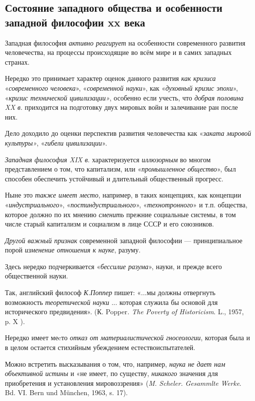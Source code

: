 \documentclass[a4paper,14pt,russian]{extreport}
\begin{document}
\subsection{Состояние западного общества и особенности западной философии xx века}

Западная философия \emph{активно реагирует} на особенности современного развития человечества, на процессы происходящие во всём мире и в самих западных странах.

Нередко это принимает характер оценок данного развития \emph{как кризиса} «\emph{современного человека}», «\emph{современной науки}», как «\emph{духовный кризис эпохи}», «\emph{кризис технической цивилизации»}, особенно если учесть, что \emph{добрая половина XX в}. приходится на подготовку двух мировых войн и залечивание ран после них.

Дело доходило до оценки перспектив развития человечества как «\emph{заката мировой культуры»}, «\emph{гибели цивилизации}».

\emph{Западная философия XIX в}. характеризуется \emph{иллюзорным} во многом представлением о том, что капитализм, или «\emph{промышленное общество}», был способен обеспечить устойчивый и длительный общественный прогресс.

Ныне это \emph{также имеет место}, например, в таких концепциях, как концепции «\emph{индустриального}», «\emph{постиндустриального}», «\emph{технотронного}» и т.п. общества, которое должно по их мнению \emph{сменить} прежние социальные системы, в том числе старый капитализм и социализм в лице СССР и его союзников.

\emph{Другой важный признак} современной западной философии --- принципиальное порой \emph{изменение отношения к науке}, разуму.

Здесь нередко подчеркивается «\emph{бессилие разума}», науки, и прежде всего общественной науки.

Так, английский философ \emph{К.Поппер} пишет: «...мы должны отвергнуть возможность \emph{теоретической науки} ... которая служила бы основой для исторического предвидения». (К. Popper\emph{. The Poverty of Historicism}. L., 1957, p. X ).

Нередко имеет меcто \emph{отказ от материалистической гносеологии}, которая была и в целом остается стихийным убеждением естествоиспытателей.

Можно встретить высказывания о том, что, например, \emph{наука не дает нам объективной истины} и «не имеет, по существу, \emph{никакого} значения для приобретения и установления мировоззрения» (\emph{M. Scheler. Gesammlte Werke}. Bd. VI. Bern und München, 1963, s. 17).
\end{document}
